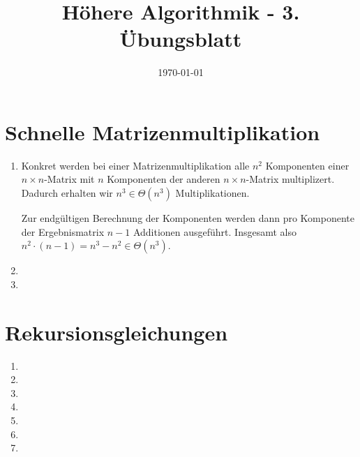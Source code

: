 \documentclass[a4paper,10pt]{scrartcl}
\title{H\"ohere Algorithmik - 3. \"Ubungsblatt}
\author{\Authors}
\date{\today}
\begin{document}
\maketitle

\section{Schnelle Matrizenmultiplikation}
\begin{enumerate}
\item   Konkret werden bei einer Matrizenmultiplikation alle $n^2$ Komponenten einer $n \times n$-Matrix mit $n$ Komponenten
        der anderen $n \times n$-Matrix multiplizert. Dadurch erhalten wir $n^3 \in \Theta(n^3)$ Multiplikationen.

        Zur endgültigen Berechnung der Komponenten werden dann pro Komponente der Ergebnismatrix $n-1$ Additionen ausgeführt.
        Insgesamt also $n^2 \cdot (n-1) = n^3 - n^2 \in \Theta(n^3)$.
\item   
\item   
\end{enumerate}


\section{Rekursionsgleichungen}
\begin{enumerate}
\item   
\item   
\item   
\item   
\item   
\item   
\item   
\end{enumerate}
\end{document}

